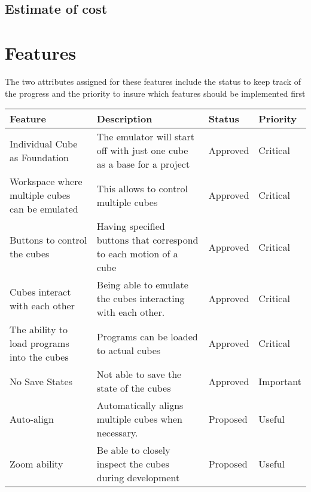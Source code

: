 \documentclass[12pt]{article}
\begin{document}
              \subsection{Estimate of cost}
\clearpage

\section{Features}
The two attributes assigned for these features include the status to keep track of the progress and the priority to insure which features should be implemented first
    \begin{table}[h]
      \begin{tabular}{p{1.5in} | p{1.75in} | p{1in} | p{1in}}
        \textbf{Feature} & \textbf{Description} & \textbf{Status} & \textbf{Priority} \\ \hline

        Individual Cube as Foundation &
        The emulator will start off with just one cube as a base for a project &
        Approved &
        Critical \\ \hline

        Workspace where multiple cubes can be emulated &
        This allows to control multiple cubes &
        Approved &
        Critical \\ \hline

        Buttons to control the cubes &
        Having specified buttons that correspond to each motion of a cube &
        Approved &
        Critical \\ \hline

        Cubes interact with each other &
        Being able to emulate the cubes interacting with each other. &
        Approved &
        Critical \\ \hline

        The ability to load programs into the cubes &
        Programs can be loaded to actual cubes &
        Approved &
        Critical \\ \hline

        No Save States &
        Not able to save the state of the cubes &
        Approved &
        Important \\ \hline

        Auto-align &
        Automatically aligns multiple cubes when necessary. &
        Proposed &
        Useful \\ \hline

        Zoom ability &
        Be able to closely inspect the cubes during development &
        Proposed &
        Useful
      \end{tabular}
    \end{table}
\end{document}
